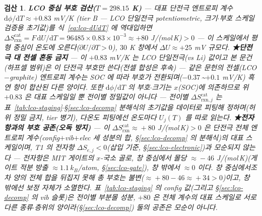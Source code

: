 \documentclass[11pt,a4paper]{article}
\newtheorem*{verifybox}{검산}
\newcommand{\dd}{\mathrm{d}}
\newcommand{\rxn}{\mathrm{rxn}}
\begin{document}
\begin{verifybox}
\textbf{LCO 중심 부호 검산($T=298.15$ K)} — 대표 단전극 엔트로피 계수 $\dd\phi/\dd T\approx+0.83$ mV/K\cite{swiderska2019}
(tier B — LCO \emph{단일전극} potentiometric, 크기$\cdot$부호 스케일 검증용 초기값)를 식~\eqref{eq:lco-dUdT}
에 역대입하면 $\Delta S_{\rxn}^\mathrm{cat}=F\,\dd U/\dd T=96485\times0.83\times10^{-3}\approx+80$ J/(mol\,K)$>0$ —
이 스케일에서 평형 중심이 온도에 \emph{오른다}($\partial U/\partial T>0$), $30$ K 창에서 $\Delta U\approx+25$ mV 규모다.
\textbf{★단전극 대 전셀 혼동 금지} — 이 $+0.83$ mV/K 는 \emph{LCO 단일전극}(vs Li) 값이고 본 문건(하프셀
범위)은 이 단전극 부호만 쓴다(전셀 합성은 후속) — 같은 문헌의 \emph{전셀}(LCO$-$graphite) 엔트로피 계수는
SOC 에 따라 부호가 전환되며($-0.37$\,\textasciitilde$+0.1$ mV/K) 흑연 항이 합산된 다른 양이다. 또한
$\dd\phi/\dd T$ 의 부호$\cdot$크기는 $x$(SOC)에 의존하므로 위 $+0.83$ 은 \emph{대표 스케일}일 뿐 전이별
정밀값이 아니다 — 전이별 $\Delta S_{\rxn,j}^\mathrm{cat}$ 는 표~\ref{tab:lco-staging}$\cdot$\S\ref{sec:lco-decomp}
분해식의 초기값을 데이터로 피팅해 정하며(허위 정밀 금지, tier 병기), 다온도 피팅에선 온도마다 $U_j(T)$ 를 따로 읽는다.
\textbf{★전자항과의 부호 공존(오독 방지)} — 이 $\Delta S_{\rxn}^\mathrm{cat}\!\approx\!+80$ J/(mol\,K)$>0$ 은
단전극 전체 엔트로피 계수(config$+$vib$+$elec 세 성분의 \emph{합}, \S\ref{sec:lco-decomp} 의 분해식)의 \emph{대표 스케일}이며,
T1 의 전자항 $\Delta S_{e,j}<0$(삽입 기준, \S\ref{sec:lco-electronic})과 모순되지 않는다 — 전자항은 MIT 게이트의
$x$-\emph{국소 골}로, 창 중심에서 몰당 $\approx\!-46$ J/(mol\,K)(게이트 적분 방출 $\approx\!1.1\,k_B$/atom,
\S\ref{sec:lco-gate}), 창 밖에서 $\approx\!0$ 이다. 창 중심에서조차 양의 전체 합을 뒤집지 못해
\emph{총 부호는 불변}($\approx\!+80-46\approx\!+34>0$)이고, 창 밖에선 보정 자체가 소멸한다. 표~\ref{tab:lco-staging}
의 config 값(그리고 \S\ref{sec:lco-decomp} 의 vib 슬롯)은 \emph{전이별 부분몰} 성분, $+80$ 은 \emph{전체 계수}의 대표 스케일로 \emph{서로 다른
종류$\cdot$층위의 양}이라(\S\ref{sec:lco-decomp}) 둘의 공존은 모순이 아니다.
\end{verifybox}
\end{document}
